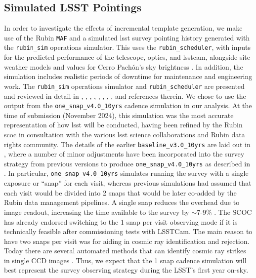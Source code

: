 \documentclass[preprintm,linenumbers]{aastex631}
\newcommand{\baselinefull}{\texttt{one\_snap\_v4.0\_10yrs}\xspace}
\newcommand{\rubinsim}{\texttt{rubin\_sim}\xspace}
\newcommand{\rubinscheduler}{\texttt{rubin\_scheduler}\xspace}
\newcommand{\maf}{\texttt{MAF}\xspace}
\begin{document}
	\subsection{Simulated LSST Pointings}
	In order to investigate the effects of incremental template generation, we make use of the Rubin \maf \citep{2014SPIE.9149E..0BJ} and a simulated \gls*{lsst} survey pointing history generated with the \rubinsim operations simulator.
 This uses the \rubinscheduler, with inputs for the predicted performance of the telescope, optics, and \gls*{lsstcam}, alongside site weather models %
 and values for Cerro Pach{\'o}n's sky brightness \citep{Yoachim2016}.
 In addition, the simulation includes realistic periods of downtime for maintenance and engineering work. 
 The \rubinsim operations simulator and \rubinscheduler are presented and reviewed in detail in \cite{2014SPIE.9150E..14C}, \cite{2014SPIE.9150E..15D}, \cite{2016SPIE.9910E..13D}, \cite{Yoachim2016},  \cite{lsstsciencecollaborationScienceDrivenOptimizationLSST2017},  \cite{2018Icar..303..181J}, \cite{2019AJ....157..151N}, \cite{jones_r_lynne_2020_4048838}, \cite{2022ApJS..258....1B} and references therein.  
 We chose to use the output from the \baselinefull cadence simulation \citep{v4.0sims,SCOC_Report_3} in our analysis. At the time of submission (November 2024), this simulation was the most accurate representation of how \gls*{lsst} will be conducted, having been refined by the Rubin \gls*{scoc} in consultation with the various \gls*{lsst} science collaborations and Rubin data rights community. 
	The details of the earlier \texttt{baseline\_v3.0\_10yrs} are laid out in \cite{SCOC_Report_2}, where a number of minor adjustments have been incorporated into the survey strategy from previous versions to produce \baselinefull as described in \cite{SCOC_Report_3}. 
    In particular, \baselinefull simulates running the survey with a single exposure or 
    ``snap'' for each visit, whereas previous simulations had assumed that each visit would be divided into 2 snaps that would be later co-added by the Rubin data management pipelines.
    A single snap reduces the overhead due to image readout, increasing the time available to the survey by $\sim$7-9$\%$ \citep[see Section 3.6 of][]{SCOC_Report_3}. 
    The SCOC has already endorsed switching to the 1 snap per visit observing mode if it is technically feasible after commissioning tests with LSSTCam. 
    The main reason to have two snaps per visit was for aiding in cosmic ray identification and rejection. 
    Today there are several automated methods that can identify cosmic ray strikes in single CCD images \citep[e.g.][]{2000PASP..112..703R, 2001PASP..113.1420V, 2005AN....326..428S, 2018zndo...1482019M}. 
    Thus, we expect that the 1 snap cadence simulation will best represent the survey observing strategy during the LSST's first year on-sky.  
   
\end{document}
